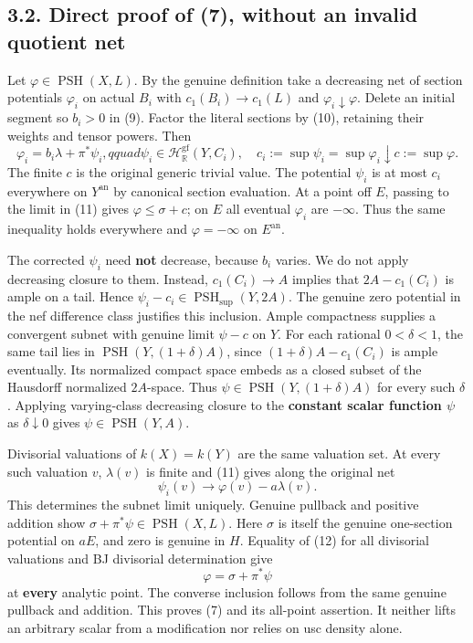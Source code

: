 \documentclass[
  10pt,
]{article}
\begin{document}
\subsection{3.2. Direct proof of (7), without an invalid quotient
net}\label{direct-proof-of-7-without-an-invalid-quotient-net}

Let \(\varphi\in\operatorname{PSH}(X,L)\). By the genuine definition
take a decreasing net of section potentials \(\varphi_i\) on actual
\(B_i\) with \(c_1(B_i)\to c_1(L)\) and \(\varphi_i\downarrow\varphi\).
Delete an initial segment so \(b_i>0\) in (9). Factor the literal
sections by (10), retaining their weights and tensor powers. Then \[
 \varphi_i=b_i\lambda+\pi^*\psi_i,qquad
 \psi_i\in\mathcal H^{\mathrm{gf}}_\mathbb R(Y,C_i),
 \quad c_i:=\sup\psi_i=\sup\varphi_i\downarrow c:=\sup\varphi.
 \tag{11}
\] The finite \(c\) is the original generic trivial value. The potential
\(\psi_i\) is at most \(c_i\) everywhere on \(Y^{\mathrm{an}}\) by
canonical section evaluation. At a point off \(E\), passing to the limit
in (11) gives \(\varphi\le\sigma+c\); on \(E\) all eventual
\(\varphi_i\) are \(-\infty\). Thus the same inequality holds everywhere
and \(\varphi=-\infty\) on \(E^{\mathrm{an}}\).

The corrected \(\psi_i\) need \textbf{not} decrease, because \(b_i\)
varies. We do not apply decreasing closure to them. Instead,
\(c_1(C_i)\to A\) implies that \(2A-c_1(C_i)\) is ample on a tail. Hence
\(\psi_i-c_i\in\operatorname{PSH}_{\sup}(Y,2A)\). The genuine zero
potential in the nef difference class justifies this inclusion. Ample
compactness supplies a convergent subnet with genuine limit \(\psi-c\)
on \(Y\). For each rational \(0<\delta<1\), the same tail lies in
\(\operatorname{PSH}(Y,(1+\delta)A)\), since \((1+\delta)A-c_1(C_i)\) is
ample eventually. Its normalized compact space embeds as a closed subset
of the Hausdorff normalized \(2A\)-space. Thus
\(\psi\in\operatorname{PSH}(Y,(1+\delta)A)\) for every such \(\delta\).
Applying varying-class decreasing closure to the \textbf{constant scalar
function \(\psi\)} as \(\delta\downarrow0\) gives
\(\psi\in\operatorname{PSH}(Y,A)\).

Divisorial valuations of \(k(X)=k(Y)\) are the same valuation set. At
every such valuation \(v\), \(\lambda(v)\) is finite and (11) gives
along the original net
\[ \psi_i(v)\longrightarrow\varphi(v)-a\lambda(v). \tag{12} \] This
determines the subnet limit uniquely. Genuine pullback and positive
addition show \(\sigma+\pi^*\psi\in\operatorname{PSH}(X,L)\). Here
\(\sigma\) is itself the genuine one-section potential on \(aE\), and
zero is genuine in \(H\). Equality of (12) for all divisorial valuations
and BJ divisorial determination give \[ \varphi=\sigma+\pi^*\psi \] at
\textbf{every} analytic point. The converse inclusion follows from the
same genuine pullback and addition. This proves (7) and its all-point
assertion. It neither lifts an arbitrary scalar from a modification nor
relies on usc density alone.
\end{document}
